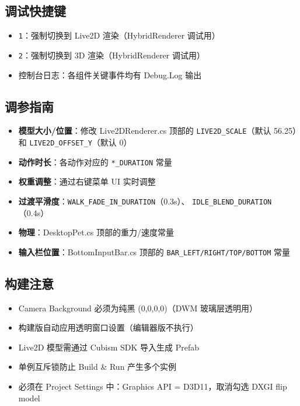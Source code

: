 \documentclass[12pt,a4paper]{ctexart}
\begin{document}
\subsection{调试快捷键}

\begin{itemize}
    \item \texttt{1}：强制切换到 Live2D 渲染（HybridRenderer 调试用）
    \item \texttt{2}：强制切换到 3D 渲染（HybridRenderer 调试用）
    \item 控制台日志：各组件关键事件均有 Debug.Log 输出
\end{itemize}

\subsection{调参指南}

\begin{itemize}
    \item \textbf{模型大小/位置}：修改 Live2DRenderer.cs 顶部的
        \texttt{LIVE2D\_SCALE}（默认 56.25）和 \texttt{LIVE2D\_OFFSET\_Y}（默认 0）
    \item \textbf{动作时长}：各动作对应的 \texttt{*\_DURATION} 常量
    \item \textbf{权重调整}：通过右键菜单 UI 实时调整
    \item \textbf{过渡平滑度}：\texttt{WALK\_FADE\_IN\_DURATION}（0.3s）、
        \texttt{IDLE\_BLEND\_DURATION}（0.4s）
    \item \textbf{物理}：DesktopPet.cs 顶部的重力/速度常量
    \item \textbf{输入栏位置}：BottomInputBar.cs 顶部的 \texttt{BAR\_LEFT/RIGHT/TOP/BOTTOM} 常量
\end{itemize}

\subsection{构建注意}

\begin{itemize}
    \item Camera Background 必须为纯黑 (0,0,0,0)（DWM 玻璃层透明用）
    \item 构建版自动应用透明窗口设置（编辑器版不执行）
    \item Live2D 模型需通过 Cubism SDK 导入生成 Prefab
    \item 单例互斥锁防止 Build \& Run 产生多个实例
    \item 必须在 Project Settings 中：Graphics API = D3D11，取消勾选 DXGI flip model
\end{itemize}
\end{document}
